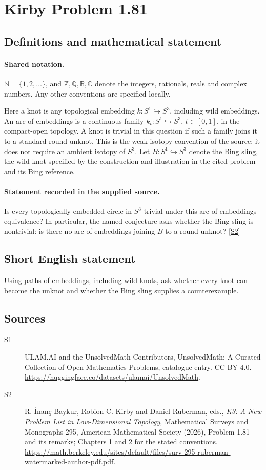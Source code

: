 \documentclass[11pt]{article}
\newcommand{\sref}[2]{\hyperlink{source:#1:#2}{[S#2]}}
\begin{document}
\section{Kirby Problem 1.81}\label{statement}

\subsection{Definitions and mathematical statement}

\paragraph{Shared notation.}$\mathbb N=\{1,2,\ldots\}$, and $\mathbb Z,\mathbb Q,\mathbb R,\mathbb C$ denote the integers, rationals, reals and complex numbers. Any other conventions are specified locally.


Here a knot is any topological embedding $k:S^1\hookrightarrow S^3$, including wild embeddings. An arc of embeddings is a continuous family $k_t:S^1\hookrightarrow S^3$, $t\in[0,1]$, in the compact-open topology. A knot is trivial in this question if such a family joins it to a standard round unknot. This is the weak isotopy convention of the source; it does not require an ambient isotopy of $S^3$. Let $B:S^1\hookrightarrow S^3$ denote the Bing sling, the wild knot specified by the construction and illustration in the cited problem and its Bing reference.
\paragraph{Statement recorded in the supplied source.}
Is every topologically embedded circle in $S^3$ trivial under this arc-of-embeddings equivalence? In particular, the named conjecture asks whether the Bing sling is nontrivial: is there no arc of embeddings joining $B$ to a round unknot? \sref{statement}{2}

\subsection{Short English statement}
Using paths of embeddings, including wild knots, ask whether every knot can become the unknot and whether the Bing sling supplies a counterexample.
\subsection{Sources}
\begin{description}
\item[\hypertarget{source:statement:1}{S1}] ULAM.AI and the UnsolvedMath Contributors, UnsolvedMath: A Curated Collection of Open Mathematics Problems, catalogue entry. CC BY 4.0. \url{https://huggingface.co/datasets/ulamai/UnsolvedMath}.
\item[\hypertarget{source:statement:2}{S2}] R. İnanç Baykur, Robion C. Kirby and Daniel Ruberman, eds., \emph{K3: A New Problem List in Low-Dimensional Topology}, Mathematical Surveys and Monographs 295, American Mathematical Society (2026), Problem 1.81 and its remarks; Chapters 1 and 2 for the stated conventions. \url{https://math.berkeley.edu/sites/default/files/surv-295-ruberman-watermarked-author-pdf.pdf}.
\end{description}
\label{end:statement}
\end{document}
